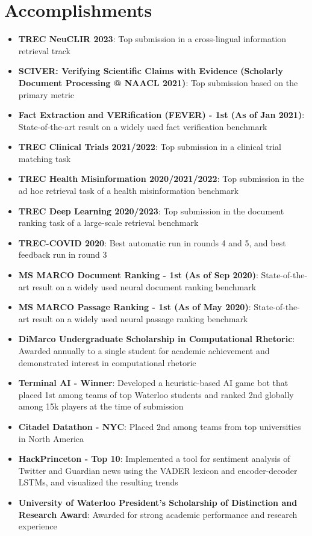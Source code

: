 \documentclass[letterpaper,12pt]{article}
\newcommand{\resumeItem}[0]{
  \item\small{ \vspace{-2pt}
  }
}
\newcommand{\resumeSubHeadingListStart}{\begin{itemize}[leftmargin=*]}
\newcommand{\resumeSubHeadingListEnd}{\end{itemize}}
\begin{document}
\section{Accomplishments}
    \resumeSubHeadingListStart
    \resumeItem{\textbf{TREC NeuCLIR 2023}}: Top submission in a cross-lingual information retrieval track
                 \vspace{-6pt}
\resumeItem{\textbf{SCIVER: Verifying Scientific Claims with Evidence (Scholarly Document Processing @ NAACL 2021)}}: Top submission based on the primary metric
         \vspace{-6pt}
\resumeItem{\textbf{Fact Extraction and VERification (FEVER) - 1st (As of Jan 2021)}}: State-of-the-art result on a widely used fact verification benchmark
    \vspace{-6pt}
    \resumeItem{\textbf{TREC Clinical Trials 2021/2022}}: Top submission in a clinical trial matching task
    \vspace{-6pt}
    \resumeItem{\textbf{TREC Health Misinformation 2020/2021/2022}}: Top submission in the ad hoc retrieval task of a health misinformation benchmark
    \vspace{-6pt}
    \resumeItem{\textbf{TREC Deep Learning 2020/2023}}: Top submission in the document ranking task of a large-scale retrieval benchmark
    \vspace{-6pt}
    \resumeItem{\textbf{TREC-COVID 2020}}: Best automatic run in rounds 4 and 5, and best feedback run in round 3
    \vspace{-6pt}
    \resumeItem{\textbf{MS MARCO Document Ranking - 1st (As of Sep 2020)}}: State-of-the-art result on a widely used neural document ranking benchmark
    \vspace{-6pt}
    \resumeItem{\textbf{MS MARCO Passage Ranking - 1st (As of May 2020)}}: State-of-the-art result on a widely used neural passage ranking benchmark
    \vspace{-6pt}
    \resumeItem{\textbf{DiMarco Undergraduate Scholarship in Computational Rhetoric}}: Awarded annually to a single student for academic achievement and demonstrated interest in computational rhetoric
    \vspace{-6pt}
    \resumeItem{\textbf{Terminal AI - Winner}}: Developed a heuristic-based AI game bot that placed 1st among teams of top Waterloo students and ranked 2nd globally among 15k players at the time of submission
    \vspace{-6pt}
    \resumeItem{\textbf{Citadel Datathon - NYC}}: Placed 2nd among teams from top universities in North America
    \vspace{-6pt}
    \resumeItem{\textbf{HackPrinceton - Top 10}}: Implemented a tool for sentiment analysis of Twitter and Guardian news using the VADER lexicon and encoder-decoder LSTMs, and visualized the resulting trends
    \vspace{-6pt}
    \resumeItem{\textbf{University of Waterloo President's Scholarship of Distinction and Research Award}}: Awarded for strong academic performance and research experience
    \vspace{-6pt}
  \resumeSubHeadingListEnd
\end{document}
